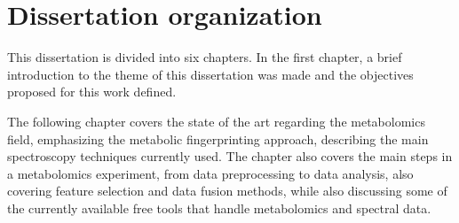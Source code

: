 %
%
%	
%	
%



\section{Dissertation organization}

This dissertation is divided into six chapters. In the first chapter, a brief introduction to the theme of this dissertation was made and the objectives proposed for this work defined. 

The following chapter covers the state of the art regarding the metabolomics field, emphasizing the metabolic fingerprinting approach, describing the main spectroscopy techniques currently used. The chapter also covers the main steps in a metabolomics experiment, from data preprocessing to data analysis, also covering feature selection and data fusion methods, while also discussing some of the currently available free tools that handle metabolomics and spectral data.

